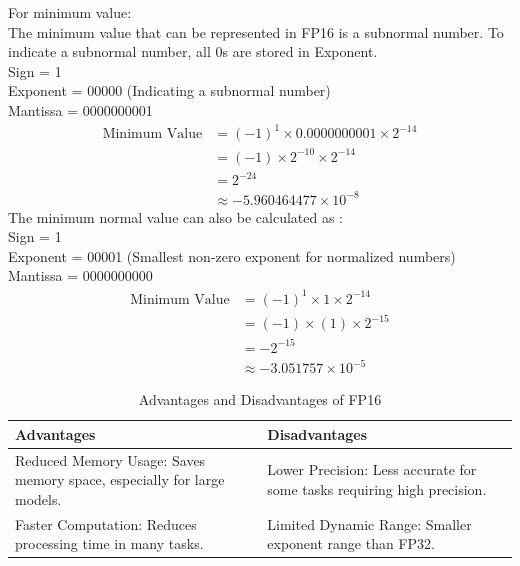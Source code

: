 \documentclass{ioereport}
\begin{document}
\begin{enumerate}[label=\textbf{\roman*.}]
    For minimum value:\\
    The minimum value that can be represented in FP16 is a subnormal number. To indicate a subnormal number, all 0s are stored in Exponent. \\
    Sign = 1 \\
    Exponent = 00000 (Indicating a subnormal number)\\
    Mantissa = 0000000001
    \[
        \begin{aligned}
            \text{Minimum Value} &= (-1)^{1} \times 0.0000000001 \times 2^{-14} \\
            & = (-1) \times 2^{-10} \times 2^{-14} \\
            & =  2^{-24} \\
            & \approx -5.960464477 \times 10^{-8}
        \end{aligned}
    \]
    The minimum normal value can also be calculated as : \\
    Sign = 1 \\
    Exponent = 00001 (Smallest non-zero exponent for normalized numbers)\\
    Mantissa = 0000000000
    \[
        \begin{aligned}
            \text{Minimum Value} &= (-1)^{1} \times 1 \times 2^{-14} \\
            & = (-1) \times (1) \times 2^{-15} \\
            & =  -2^{-15} \\
            & \approx -3.051757 \times 10^{-5}
        \end{aligned}
    \]

 
    \begin{table}[H]
        \centering
        \caption{Advantages and Disadvantages of FP16}
        \label{tab:fp16}
        \begin{tabular}{|p{6cm}|p{6cm}|}
        \hline
        \textbf{Advantages} & \textbf{Disadvantages} \\
        \hline
        Reduced Memory Usage: Saves memory space, especially for large models. & Lower Precision: Less accurate for some tasks requiring high precision. \\
        \hline
        Faster Computation: Reduces processing time in many tasks. & Limited Dynamic Range: Smaller exponent range than FP32. \\
        \hline
        \end{tabular}
    \end{table}


\end{enumerate}
\end{document}
